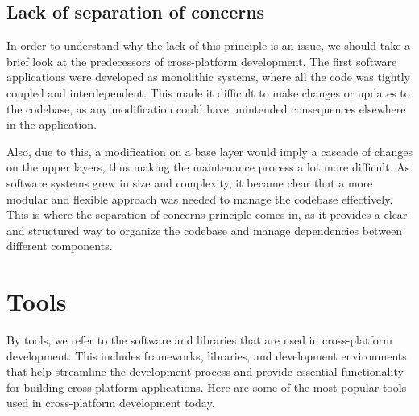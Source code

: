 \subsection{Lack of separation of concerns}
In order to understand why the lack of this principle is an issue, we should take a brief look at the predecessors of cross-platform development.
The first software applications were developed as monolithic systems, where all the code was tightly coupled and interdependent.
This made it difficult to make changes or updates to the codebase, as any modification could have unintended consequences elsewhere in the application.

\par
Also, due to this, a modification on a base layer would imply a cascade of changes on the upper layers, thus making the maintenance process a lot more difficult.
As software systems grew in size and complexity, it became clear that a more modular and flexible approach was needed to manage the codebase effectively.
This is where the separation of concerns principle comes in, as it provides a clear and structured way to organize the codebase and manage dependencies between different components.

\section{Tools}
By tools, we refer to the software and libraries that are used in cross-platform development.
This includes frameworks, libraries, and development environments that help streamline the development process and provide essential functionality for building cross-platform applications.
Here are some of the most popular tools used in cross-platform development today.

